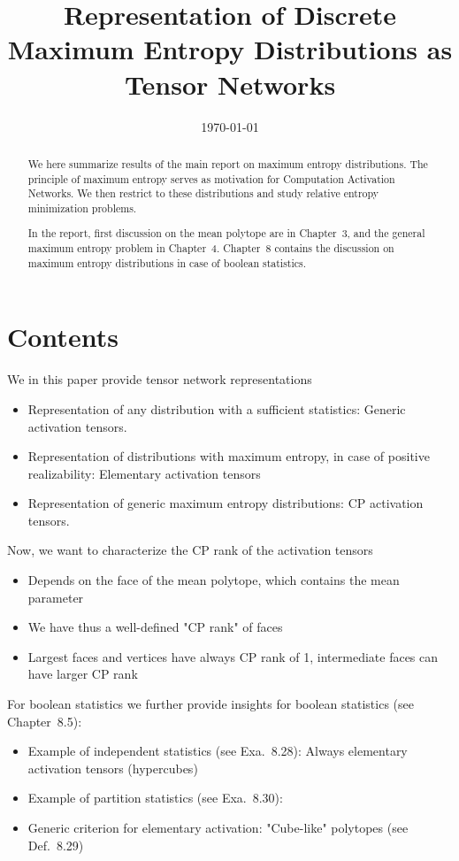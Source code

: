 \documentclass[aps,onecolumn,nofootinbib,pra]{article}
\begin{document}
    \title{Representation of Discrete Maximum Entropy Distributions as Tensor Networks}

    \maketitle
    \date{\today}

    \begin{abstract}
        We here summarize results of the main report on maximum entropy distributions.
        The principle of maximum entropy serves as motivation for Computation Activation Networks.
        We then restrict to these distributions and study relative entropy minimization problems.

        In the report, first discussion on the mean polytope are in Chapter~3, and the general maximum entropy problem in Chapter~4.
        Chapter~8 contains the discussion on maximum entropy distributions in case of boolean statistics.
    \end{abstract}


    \section{Contents}

    We in this paper provide tensor network representations
    \begin{itemize}
        \item Representation of any distribution with a sufficient statistics: Generic activation tensors.
        \item Representation of distributions with maximum entropy, in case of positive realizability: Elementary activation tensors
        \item Representation of generic maximum entropy distributions: CP activation tensors.
    \end{itemize}

    Now, we want to characterize the CP rank of the activation tensors
    \begin{itemize}
        \item Depends on the face of the mean polytope, which contains the mean parameter
        \item We have thus a well-defined "CP rank" of faces
        \item Largest faces and vertices have always CP rank of 1, intermediate faces can have larger CP rank
    \end{itemize}

    For boolean statistics we further provide insights for boolean statistics (see Chapter~8.5):
    \begin{itemize}
        \item Example of independent statistics (see Exa.~8.28): Always elementary activation tensors (hypercubes)
        \item Example of partition statistics (see Exa.~8.30):
        \item Generic criterion for elementary activation: "Cube-like" polytopes (see Def.~8.29)
    \end{itemize}
\end{document}
